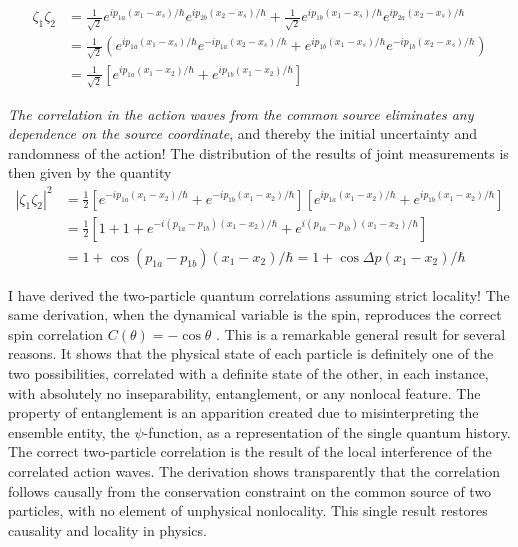 \begin{align*}
\zeta_1 \zeta_2 & = \frac{1}{\sqrt{2}} e^{ip_{1a} (x_1- x_s) /\hbar} e^{ip_{2b} (x_2 -x_s) /\hbar} + \frac{1}{\sqrt{2}} e^{ip_{1b} (x_1 - x_s) /\hbar} e^{ip_{2a} (x_2 - x_s) /\hbar}\\
& = \frac{1}{\sqrt{2}}  \left(e^{ip_{1a} (x_1- x_s) /\hbar} e^{-ip_{1a} (x_2 -x_s) /\hbar} + e^{ip_{1b} (x_1 - x_s) /\hbar} e^{-ip_{1b} (x_2 - x_s) /\hbar} \right)\\
& = \frac{1}{\sqrt{2}} \left[ e^{ip_{1a} (x_1- x_2) / \hbar} + e^{ip_{1b} (x_1 -x_2) /\hbar}  \right]\tag{37}\label{c14-eq37}
\end{align*}

\textit{The correlation in the action waves from the common source eliminates any dependence on
the source coordinate}, and thereby the initial uncertainty and randomness of the action! The
distribution of the results of joint measurements is then given by the quantity
\begin{align*}
|\zeta_1 \zeta_2|^2 & = \frac{1}{2} \left[e^{-ip_{1a} (x_1 -x_2)/\hbar} + e^{-ip_{1b} (x_1-x_2)/\hbar} \right] \left[e^{ip_{1a} (x_1 -x_2) /\hbar} + e^{ip_{1b} (x_1 - x_2)/\hbar} \right] \\
& = \frac{1}{2} \left[1+1+e^{-i(p_{1a} - p_{1b}) (x_1-x_2)/\hbar } + e^{i(p_{1a} -p_{1b}) (x_1-x_2)/\hbar} \right]\\
& = 1 + \cos (p_{1a} - p_{1b}) (x_1 -x_2) / \hbar = 1 + \cos \Delta p (x_1-x_2) / \hbar\tag{38}\label{c14-eq38}
\end{align*}


I have derived the two-particle quantum correlations assuming strict locality! The same
derivation, when the dynamical variable is the spin, reproduces the correct spin correlation
$C(\theta) =- \cos \theta$ \cite{chap14-key2}. This is a remarkable general result for several reasons. It shows that
the physical state of each particle is definitely one of the two possibilities, correlated with
a definite state of the other, in each instance, with absolutely no inseparability, entanglement, or any nonlocal feature. The property of entanglement is an apparition created due to misinterpreting the ensemble entity, the $\psi$-function, as a representation of the single quantum history. The correct two-particle correlation is the result of the local interference of the correlated action waves. The derivation shows transparently that the correlation follows causally from the conservation constraint on the common source of two particles, with no element of unphysical nonlocality. This single result restores causality and locality in
physics.

